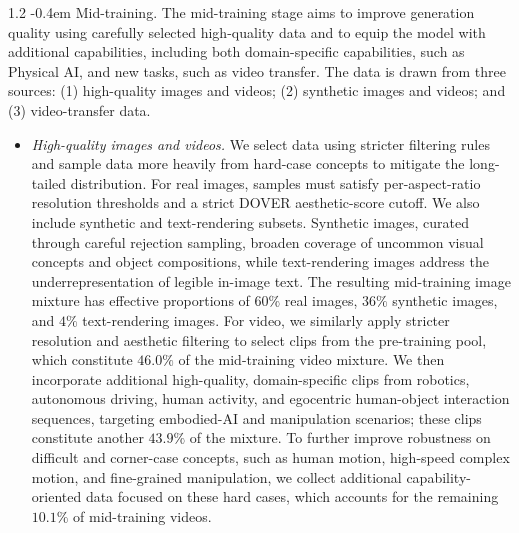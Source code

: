 \documentclass{llmxive}
\makeatletter
\providecommand{\paragraph}{  \@startsection{paragraph}{4}{\z@}    {1\baselineskip \@plus .2\baselineskip}    {-0.4em}    {\normalfont\normalsize\bfseries}}
\makeatother
\begin{document}
\paragraph{Mid-training.} The mid-training stage aims to improve generation quality using carefully selected high-quality data and to equip the model with additional capabilities, including both domain-specific capabilities, such as Physical AI, and new tasks, such as video transfer. The data is drawn from three sources: (1) high-quality images and videos; (2) synthetic images and videos; and (3) video-transfer data.

\begin{itemize}
\item \textit{High-quality images and videos.} We select data using stricter filtering rules and sample data more heavily from hard-case concepts to mitigate the long-tailed distribution. For real images, samples must satisfy per-aspect-ratio resolution thresholds and a strict DOVER aesthetic-score cutoff. We also include synthetic and text-rendering subsets. Synthetic images, curated through careful rejection sampling, broaden coverage of uncommon visual concepts and object compositions, while text-rendering images address the underrepresentation of legible in-image text. The resulting mid-training image mixture has effective proportions of $60\%$ real images, $36\%$ synthetic images, and $4\%$ text-rendering images. For video, we similarly apply stricter resolution and aesthetic filtering to select clips from the pre-training pool, which constitute $46.0\%$ of the mid-training video mixture. We then incorporate additional high-quality, domain-specific clips from robotics, autonomous driving, human activity, and egocentric human-object interaction sequences, targeting embodied-AI and manipulation scenarios; these clips constitute another $43.9\%$ of the mixture. To further improve robustness on difficult and corner-case concepts, such as human motion, high-speed complex motion, and fine-grained manipulation, we collect additional capability-oriented data focused on these hard cases, which accounts for the remaining $10.1\%$ of mid-training videos.


\end{itemize}
\end{document}
